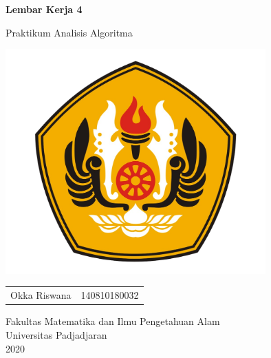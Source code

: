 \begin{titlepage}
\centering

\begin{Large}
    \textbf{%
        Lembar Kerja 4
    } \\
    
    \vspace{0.5cm}
    
    Praktikum Analisis Algoritma
\end{Large}

\vspace{1.5cm}

\includegraphics[width=0.75\textwidth]{img/logo-unpad.png} \\

\vspace{1.5cm}

\begin{large}
    \begin{tabular}{l r}
        Okka Riswana    & 140810180032
    \end{tabular}
\end{large}

\vfill

\begin{large}
    Fakultas Matematika dan Ilmu Pengetahuan Alam \\
    Universitas Padjadjaran \\
    2020
\end{large}

\end{titlepage}